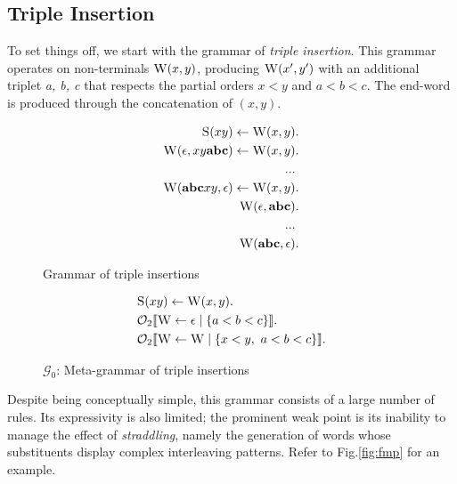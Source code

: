\documentclass[nonatbib,numbers,10pt]{llncs}
\newcommand\s{\textsc}
\newcommand{\Orderr}[5]{
	\mathcal{#1}_{#5}\llbracket #2 \leftarrow #3 \mid \{ #4 \} \rrbracket.
}
\newcommand{\Or}[4]{\Orderr{O}{#1}{#2}{#3}{#4}}
\begin{document}
\subsection{Triple Insertion}
To set things off, we start with the grammar of \textit{triple insertion}. This grammar operates on non-terminals $\s{W}(x,y)$, producing $\s{W}(x',y')$ with an additional triplet \textit{a, b, c} that respects the partial orders $x<y$ and $a<b<c$. The end-word is produced through the concatenation of $(x,y)$.

\begin{figure}
  \begin{minipage}{0.45\textwidth}
  	\centering
    \begin{align}
	\setcounter{equation}{0}
	\s{S}(xy) \leftarrow \s{W}(x,y)&. \\
	\s{W}(\epsilon, xy\textbf{abc}) \leftarrow \s{W}(x,y)&. \\
	... \nonumber \\
	\setcounter{equation}{60}
	\s{W}(\textbf{abc}xy, \epsilon) \leftarrow \s{W}(x,y)&. \\
	\s{W}(\epsilon, \textbf{abc})&. \\
	... \nonumber \\
	\setcounter{equation}{64}
	\s{W}(\textbf{abc}, \epsilon)&.
	\end{align}
	\caption{Grammar of triple insertions}
    \label{fig:1}
  \end{minipage} \hspace{0.05\textwidth}
  \begin{minipage}{0.55\textwidth}
  	\centering
  	\begin{align*}
	&\s{S}(xy) \leftarrow \s{W}(x,y). \\
	&\Or{\s{W}}{\epsilon}{a < b < c}{2} \\
	&\Or{\s{W}}{\s{W}}{x < y,\ a < b < c}{2}
	\end{align*}
	\caption{$\mathcal{G}_0$: Meta-grammar of triple insertions}
	\label{fig:meta-ins}
  \end{minipage}
\end{figure}

Despite being conceptually simple, this grammar consists of a large number of rules. Its expressivity is also limited; the prominent weak point is its inability to manage the effect of \textit{straddling}, namely the generation of words whose substituents display complex interleaving patterns. Refer to Fig.\ref{fig:fmp} for an example.
\end{document}
